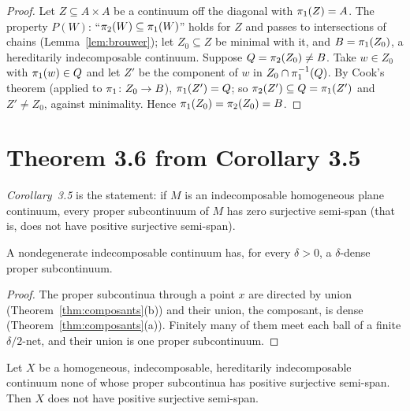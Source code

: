 \begin{proof}
Let $Z\subseteq A\times A$ be a continuum off the diagonal with $\pi_{1}(Z)=A$. The property $P(W)$: ``$\pi_{2}(W)\subseteq\pi_{1}(W)$'' holds for $Z$ and passes to
intersections of chains (Lemma~\ref{lem:brouwer}); let $Z_0\subseteq Z$ be minimal with it, and $B=\pi_{1}(Z_0)$, a hereditarily indecomposable continuum.
Suppose $Q=\pi_{2}(Z_0)\ne B$. Take $w\in Z_0$ with $\pi_{1}(w)\in Q$ and let $Z'$ be the component of $w$ in $Z_0\cap\pi_{1}^{-1}(Q)$. By Cook's theorem (applied to
$\pi_{1}\colon Z_0\to B$), $\pi_{1}(Z')=Q$; so $\pi_{2}(Z')\subseteq Q=\pi_{1}(Z')$ and $Z'\ne Z_0$, against minimality. Hence $\pi_{1}(Z_0)=\pi_{2}(Z_0)=B$.
\end{proof}


\section{Theorem 3.6 from Corollary 3.5}

\begin{definition}
\emph{Corollary~3.5} is the statement: if $M$ is an indecomposable homogeneous plane continuum, every proper subcontinuum of $M$ has zero surjective
semi-span (that is, does not have positive surjective semi-span).
\end{definition}


\begin{lemma}\label{lem:dense-proper}
A nondegenerate indecomposable continuum has, for every $\delta>0$, a $\delta$-dense proper subcontinuum.
\end{lemma}

\begin{proof}
The proper subcontinua through a point $x$ are directed by union (Theorem~\ref{thm:composants}(b)) and their union, the composant, is dense
(Theorem~\ref{thm:composants}(a)). Finitely many of them meet each ball of a finite $\delta/2$-net, and their union is one proper subcontinuum.
\end{proof}


\begin{theorem}\label{thm:ot36}
Let $X$ be a homogeneous, indecomposable, hereditarily indecomposable continuum none of whose proper subcontinua has positive surjective
semi-span. Then $X$ does not have positive surjective semi-span.
\end{theorem}

